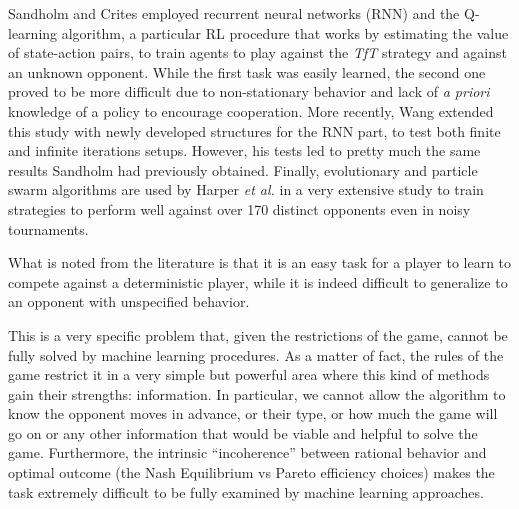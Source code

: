 \documentclass[journal,10pt,twoside]{IEEEtran}
\begin{document}
Sandholm and Crites \cite{sandholmRL} employed recurrent neural networks (RNN) and the Q-learning algorithm, a particular RL procedure that works by estimating the value of state-action pairs, to train agents to play against the \textit{TfT} strategy and against an unknown opponent. While the first task was easily learned, the second one proved to be more difficult due to non-stationary behavior and lack of \textit{a priori} knowledge of a policy to encourage cooperation.
More recently, Wang \cite{kedaoRL} extended this study with newly developed structures for the RNN part, to test both finite and infinite iterations setups. However, his tests led to pretty much the same results Sandholm had previously obtained.
Finally, evolutionary and particle swarm algorithms are used by Harper \textit{et al.} in a very extensive study \cite{plosRLdominant} to train strategies to perform well against over 170 distinct opponents even in noisy tournaments.

What is noted from the literature is that it is an easy task for a player to learn to compete against a deterministic player, while it is indeed difficult to generalize to an opponent with unspecified behavior.

This is a very specific problem that, given the restrictions of the game, cannot be fully solved by machine learning procedures. As a matter of fact, the rules of the game restrict it in a very simple but powerful area where this kind of methods gain their strengths: information. In particular, we cannot allow the algorithm to know the opponent moves in advance, or their type, or how much the game will go on or any other information that would be viable and helpful to solve the game. Furthermore, the intrinsic ``incoherence'' between rational behavior and optimal outcome (the Nash Equilibrium vs Pareto efficiency choices) makes the task extremely difficult to be fully examined by machine learning approaches.
\end{document}
